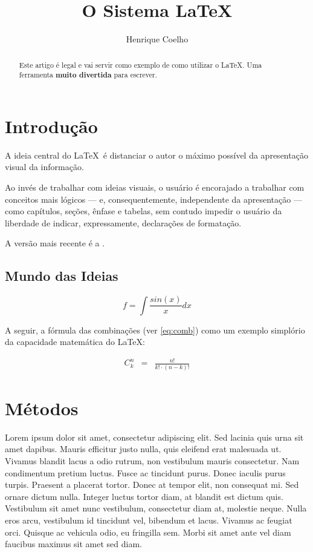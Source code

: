 \documentclass[12pt,a4paper]{article}
\title{O Sistema \LaTeX}
\author{Henrique Coelho}
\begin{document}
	\maketitle
	\begin{abstract}
		Este artigo é legal e vai servir como exemplo de como utilizar o \LaTeX. Uma ferramenta \textbf{muito divertida} para escrever.
	\end{abstract}
	\tableofcontents
	\section{Introdução}
	A ideia central do \LaTeX\ é distanciar o autor
	o máximo possível da apresentação visual da informação.
	
	Ao invés de trabalhar com ideias visuais, o usuário é
	encorajado a trabalhar com conceitos mais lógicos --- e,
	consequentemente, independente da apresentação --- como capítulos,
	seções, ênfase e tabelas, sem contudo impedir o usuário da
	liberdade de indicar, expressamente, declarações de formatação.
	
	A versão mais recente é a \LaTeXe.
	\subsection{Mundo das Ideias}
	\begin{equation}
		f=\int \frac{sin(x)}{x} dx
	\end{equation}
	
	A seguir, a fórmula das combinações (ver \ref{eq:comb}) como um exemplo simplório
	da capacidade matemática do \LaTeX:
	
	\begin{eqnarray}
		C_k^n &=& \frac{n!}{k!\cdot(n-k)!} \label{eq:comb}
	\end{eqnarray}

	\section{Métodos}
	 Lorem ipsum dolor sit amet, consectetur adipiscing elit. Sed lacinia quis urna sit amet dapibus. Mauris efficitur justo nulla, quis eleifend erat malesuada ut. Vivamus blandit lacus a odio rutrum, non vestibulum mauris consectetur. Nam condimentum pretium luctus. Fusce ac tincidunt purus. Donec iaculis purus turpis. Praesent a placerat tortor. Donec at tempor elit, non consequat mi. Sed ornare dictum nulla. Integer luctus tortor diam, at blandit est dictum quis. Vestibulum sit amet nunc vestibulum, consectetur diam at, molestie neque. Nulla eros arcu, vestibulum id tincidunt vel, bibendum et lacus. Vivamus ac feugiat orci. Quisque ac vehicula odio, eu fringilla sem. Morbi sit amet ante vel diam faucibus maximus sit amet sed diam.
	
\end{document}
